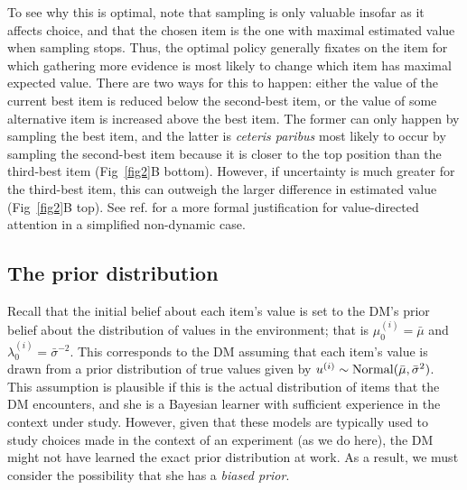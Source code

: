 To see why this is optimal, note that sampling is only valuable insofar as it affects choice, and that the chosen item is the one with maximal estimated value when sampling stops. Thus, the optimal policy generally fixates on the item for which gathering more evidence is most likely to change which item has maximal expected value. There are two ways for this to happen: either the value of the current best item is reduced below the second-best item, or the value of some alternative item is increased above the best item. The former can only happen by sampling the best item, and the latter is \emph{ceteris paribus} most likely to occur by sampling the second-best item because it is closer to the top position than the third-best item (Fig~\ref{fig2}B bottom). However, if uncertainty is much greater for the third-best item, this can outweigh the larger difference in estimated value (Fig~\ref{fig2}B top). See ref. \citealp{sepulveda2020visual} for a more formal justification for value-directed attention in a simplified non-dynamic case.

\subsection{The prior distribution}
Recall that the initial belief about each item's value is set to the DM's prior belief about the distribution of values in the environment; that is $\mu_0^{(i)} = \bar{\mu}$ and $\lambda_0^{(i)} = \bar{\sigma}^{-2}$. This corresponds to the DM assuming that each item's value is drawn from a prior distribution of true values given by $u^{(i)} \sim \mathrm{Normal}(\bar{\mu}, \bar{\sigma}^2)$. This assumption is plausible if this is the actual distribution of items that the DM encounters, and she is a Bayesian learner with sufficient experience in the context under study. However, given that these models are typically used to study choices made in the context of an experiment (as we do here), the DM might not have learned the exact prior distribution at work. As a result, we must consider the possibility that she has a \emph{biased prior}.


